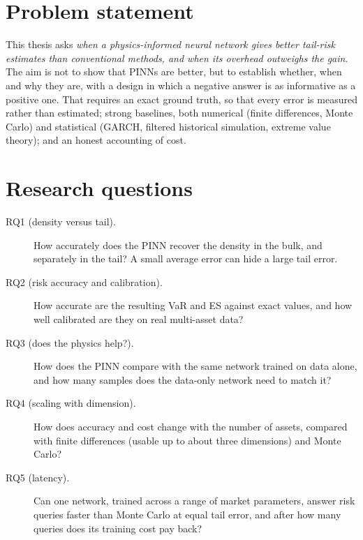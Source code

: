 \section{Problem statement}
This thesis asks \emph{when a physics-informed neural network gives better tail-risk estimates than
conventional methods, and when its overhead outweighs the gain}. The aim is not to show that PINNs are better,
but to establish whether, when and why they are, with a design in which a negative answer is as informative as a
positive one. That requires an exact ground truth, so that every error is measured rather than estimated; strong
baselines, both numerical (finite differences, Monte Carlo) and statistical (GARCH, filtered historical
simulation, extreme value theory); and an honest accounting of cost.

\section{Research questions}
\begin{description}
  \item[RQ1 (density versus tail).] How accurately does the PINN recover the density in the bulk, and separately
    in the tail? A small average error can hide a large tail error.
  \item[RQ2 (risk accuracy and calibration).] How accurate are the resulting VaR and ES against exact values,
    and how well calibrated are they on real multi-asset data?
  \item[RQ3 (does the physics help?).] How does the PINN compare with the same network trained on data alone,
    and how many samples does the data-only network need to match it?
  \item[RQ4 (scaling with dimension).] How does accuracy and cost change with the number of assets, compared with
    finite differences (usable up to about three dimensions) and Monte Carlo?
  \item[RQ5 (latency).] Can one network, trained across a range of market parameters, answer risk queries faster
    than Monte Carlo at equal tail error, and after how many queries does its training cost pay back?
\end{description}

